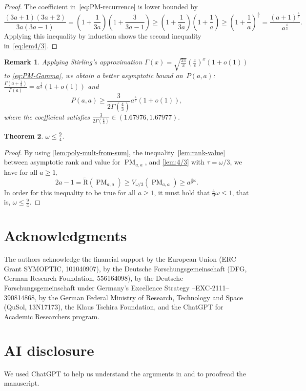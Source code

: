 \documentclass[11pt,letterpaper]{article}
\newtheorem{theorem}{Theorem}[section]
\newtheorem{remark}[theorem]{Remark}\AddToHook{env/remark/begin}{\crefalias{theorem}{remark}}
\numberwithin{equation}{section}
\newcommand{\ark}{\widetilde{\mathrm{R}}}
\DeclareMathOperator{\PM}{PM}
\begin{document}
\begin{proof}
The coefficient in~\cref{eq:PM-recurrence} is lower bounded by
\[
    \frac{(3a+1)(3a+2)}{3a(3a-1)} = \left(1 + \frac1{3a}\right)\left(1 + \frac3{3a - 1}\right) \ge \left(1 + \frac1{3a}\right)\left(1 + \frac1a\right) \ge \left(1 + \frac1a\right)^{\frac43} = \frac{(a+1)^{\frac43}}{a^{\frac43}}.
\]
Applying this inequality by induction shows the second inequality in~\cref{eq:lem4/3}.
\end{proof}

\begin{remark}\label{rem:gamma-coefficient}
    Applying Stirling's approximation $\Gamma(x) = \sqrt{\frac{2\pi}{x}}\left(\frac{x}{e}\right)^{x} (1 + o(1))$ to \cref{eq:PM-Gamma}, we obtain a better asymptotic bound on~$P(a, a)$:
    $\frac{\Gamma(a + \frac13)}{\Gamma(a)} = a^{\frac13} (1 + o(1))$ and
    \[P(a, a) \geq \frac{3}{2 \Gamma(\frac43)} a^{\frac43} (1 + o(1)),\]
    where the coefficient satisfies $\frac{3}{2 \Gamma(\frac43)} \in (1.67976,1.67977)$.
\end{remark}

\begin{theorem}\label{thm:omega-le-nine-fourths}
  $\omega \leq \frac94$.
\end{theorem}
\begin{proof}
  By using \cref{lem:poly-mult-from-sum}, the inequality~\cref{lem:rank-value} between asymptotic rank and value for $\PM_{a, a}$, and \cref{lem:4/3} with $\tau = \omega/3$, we have for all $a \ge 1$,
  \[
    2a - 1 = \ark(\PM_{a, a}) \ge V_{\omega/3}(\PM_{a, a}) \ge a^{\frac49\omega}.
  \]
  In order for this inequality to be true for all $a \ge 1$, it must hold that $\frac49\omega \le 1$, that is, $\omega \le \frac94$.
\end{proof}




\section*{Acknowledgments}
The authors acknowledge the financial support by the European Union (ERC Grant SYMOPTIC, 101040907), by the Deutsche Forschungsgemeinschaft (DFG, German Research Foundation, 556164098), by the Deutsche Forschungsgemeinschaft under Germany's Excellence Strategy --EXC-2111-- 390814868, by the German Federal Ministry of Research, Technology and Space (QuSol, 13N17173), the Klaus Tschira Foundation, and the ChatGPT for Academic Researchers program.

\section*{AI disclosure}
We used ChatGPT to help us understand the arguments in \cite{chatgpt-paper} and to proofread the manuscript.



\end{document}
